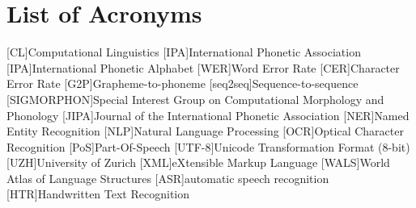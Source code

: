 {}
\chapter*{List of Acronyms}
\begin{acronym}
[CL]{Computational Linguistics}
[IPA]{International Phonetic Association}
[IPA]{International Phonetic Alphabet}
[WER]{Word Error Rate}
[CER]{Character Error Rate}
[G2P]{Grapheme-to-phoneme} 
[seq2seq]{Sequence-to-sequence} 
[SIGMORPHON]{Special Interest Group on Computational  Morphology and Phonology}
[JIPA]{Journal of the International Phonetic Association}
[NER]{Named Entity Recognition}
[NLP]{Natural Language Processing}
[OCR]{Optical Character Recognition}
[PoS]{Part-Of-Speech}
[UTF-8]{Unicode Transformation Format (8-bit)}
[UZH]{University of Zurich}
[XML]{eXtensible Markup Language}
[WALS]{World Atlas of Language Structures}
[ASR]{automatic speech recognition}
[HTR]{Handwritten Text Recognition}
\end{acronym}